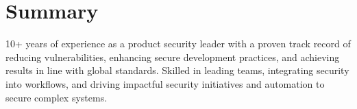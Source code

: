 
\section{Summary}

10+ years of experience as a product security leader with a proven track record of \break reducing vulnerabilities, enhancing secure development practices, and achieving results in line with global standards. Skilled in leading teams, integrating security into workflows, and driving impactful security initiatives and automation to secure complex systems. \break
